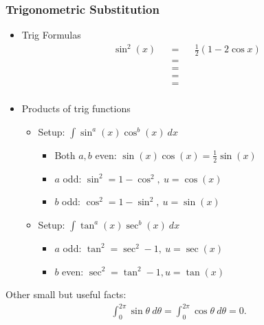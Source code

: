 \hypertarget{trigonometric-substitution}{%
\subsubsection{Trigonometric
Substitution}\label{trigonometric-substitution}}


\begin{itemize}
\item
  Trig Formulas
  \begin{align*}
  \sin^2(x) && = && \frac{1}{2}(1-2\cos x) \\
  && = && \\
  && = && \\
  && = && \\
  && = && \\
  \end{align*} 
\item
  Products of trig functions

  \begin{itemize}
  \tightlist
  \item
    Setup: \(\int \sin^a(x) \cos^b(x) ~dx\)

    \begin{itemize}
    \tightlist
    \item
      Both \(a,b\) even: \(\sin(x)\cos(x) = \frac{1}{2} \sin(x)\)
    \item
      \(a\) odd: \(\sin^2 = 1-\cos^2,~u=\cos(x)\)
    \item
      \(b\) odd: \(\cos^2 = 1-\sin^2,~u=\sin(x)\)
    \end{itemize}
  \item
    Setup: \(\int \tan^a(x) \sec^b(x) ~dx\)

    \begin{itemize}
    \tightlist
    \item
      \(a\) odd: \(\tan^2 = \sec^2 - 1,~ u = \sec(x)\)
    \item
      \(b\) even: \(\sec^2 = \tan^2 - 1, u = \tan(x)\)
    \end{itemize}
  \end{itemize}
\end{itemize}

Other small but useful facts:
\begin{align*}  
\int_0^{2\pi} \sin \theta~d\theta = \int_0^{2\pi} \cos \theta~d\theta = 0
.\end{align*}

